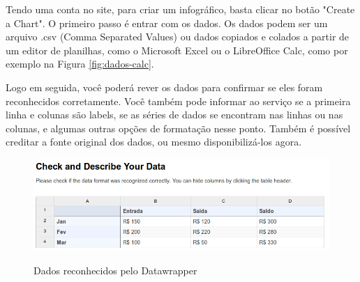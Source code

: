 \documentclass[12pt,onecolumn]{article}
\begin{document}
    Tendo uma conta no site, para criar um infográfico, basta clicar no botão 
    "Create a Chart". O primeiro passo é entrar com os dados. Os dados podem ser 
    um arquivo .csv (Comma Separated Values) ou dados copiados e colados a partir
    de um editor de planilhas, como o Microsoft Excel ou o LibreOffice Calc, como
    por exemplo na Figura \ref{fig:dados-calc}.
    
    
    Logo em seguida, você poderá rever os dados para confirmar se eles foram
    reconhecidos corretamente. Você também pode informar ao serviço se a primeira
    linha e colunas são labels, se as séries de dados se encontram nas linhas ou
    nas colunas, e algumas outras opções de formatação nesse ponto. Também é
    possível creditar a fonte original dos dados, ou mesmo disponibilizá-los agora.
    
    \begin{figure}[H]
      \begin{center}
        \includegraphics[scale = 0.5]{datawrapper-data.png}
        \label{fig:datawrapper-data}
        \caption{Dados reconhecidos pelo Datawrapper}
      \end{center}
    \end{figure}
    
\end{document}
